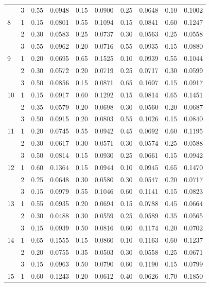 \begin{longtable}{llcccccccc}
   & 3 & 0.55 & 0.0948 & 0.15 & 0.0900 & 0.25 & 0.0648 & 0.10 & 0.1002 \\ 
  8 & 1 & 0.15 & 0.0801 & 0.55 & 0.1094 & 0.15 & 0.0841 & 0.60 & 0.1247 \\ 
   & 2 & 0.30 & 0.0583 & 0.25 & 0.0737 & 0.30 & 0.0563 & 0.25 & 0.0558 \\ 
   & 3 & 0.55 & 0.0962 & 0.20 & 0.0716 & 0.55 & 0.0935 & 0.15 & 0.0880 \\ 
  9 & 1 & 0.20 & 0.0695 & 0.65 & 0.1525 & 0.10 & 0.0939 & 0.55 & 0.1044 \\ 
   & 2 & 0.30 & 0.0572 & 0.20 & 0.0719 & 0.25 & 0.0717 & 0.30 & 0.0599 \\ 
   & 3 & 0.50 & 0.0856 & 0.15 & 0.0871 & 0.65 & 0.1607 & 0.15 & 0.0917 \\ 
  10 & 1 & 0.15 & 0.0917 & 0.60 & 0.1292 & 0.15 & 0.0814 & 0.65 & 0.1451 \\ 
   & 2 & 0.35 & 0.0579 & 0.20 & 0.0698 & 0.30 & 0.0560 & 0.20 & 0.0687 \\ 
   & 3 & 0.50 & 0.0915 & 0.20 & 0.0803 & 0.55 & 0.1026 & 0.15 & 0.0840 \\ 
  11 & 1 & 0.20 & 0.0745 & 0.55 & 0.0942 & 0.45 & 0.0692 & 0.60 & 0.1195 \\ 
   & 2 & 0.30 & 0.0617 & 0.30 & 0.0571 & 0.30 & 0.0574 & 0.25 & 0.0588 \\ 
   & 3 & 0.50 & 0.0814 & 0.15 & 0.0930 & 0.25 & 0.0661 & 0.15 & 0.0942 \\ 
  12 & 1 & 0.60 & 0.1364 & 0.15 & 0.0944 & 0.10 & 0.0945 & 0.65 & 0.1470 \\ 
   & 2 & 0.25 & 0.0648 & 0.30 & 0.0580 & 0.30 & 0.0547 & 0.20 & 0.0717 \\ 
   & 3 & 0.15 & 0.0979 & 0.55 & 0.1046 & 0.60 & 0.1141 & 0.15 & 0.0823 \\ 
  13 & 1 & 0.55 & 0.0935 & 0.20 & 0.0694 & 0.15 & 0.0788 & 0.45 & 0.0664 \\ 
   & 2 & 0.30 & 0.0488 & 0.30 & 0.0559 & 0.25 & 0.0589 & 0.35 & 0.0565 \\ 
   & 3 & 0.15 & 0.0939 & 0.50 & 0.0816 & 0.60 & 0.1174 & 0.20 & 0.0702 \\ 
  14 & 1 & 0.65 & 0.1555 & 0.15 & 0.0860 & 0.10 & 0.1163 & 0.60 & 0.1237 \\ 
   & 2 & 0.20 & 0.0755 & 0.35 & 0.0503 & 0.30 & 0.0558 & 0.25 & 0.0671 \\ 
   & 3 & 0.15 & 0.0963 & 0.50 & 0.0790 & 0.60 & 0.1190 & 0.15 & 0.0799 \\ 
  15 & 1 & 0.60 & 0.1243 & 0.20 & 0.0612 & 0.40 & 0.0626 & 0.70 & 0.1850 \\ 

\end{longtable}
